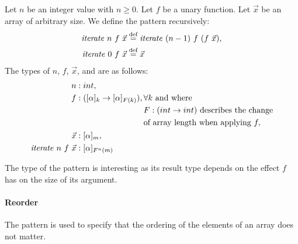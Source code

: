 \begin{definition}
  \label{definition:pattern:iterate}
  Let $n$ be an integer value with $n \geq 0$.
  Let $f$ be a unary function.
  Let $\vec{x}$ be an array of arbitrary size.
  We define the \iterateN pattern recursively:
  \begin{align*}
    \iterateN\ n\ f\ \vec{x} &\eqdef \iterateN\ (n-1)\ f\ (f\ \vec{x}),\\
    \iterateN\ 0\ f\ \vec{x} &\eqdef \vec{x}
  \end{align*}
  The types of $n$, $f$, $\vec{x}$, and \iterateN are as follows:
  \begin{align*}
    n &: int,\\
    f &: ([\alpha]_k \rightarrow [\alpha]_{F(k)}), 
      \begin{aligned}[t]
        & \forall k \text{ and where } \\
        &F : (int\rightarrow int) \text{ describes the change}\\
        &\text{of array length when applying } f,
      \end{aligned}\\
    \vec{x} &: [\alpha]_m,\\
    \text{\textit{iterate}}\ n\ f\ \vec{x} &: [\alpha]_{F^n(m)}
  \end{align*}
\end{definition}


\noindent
{}
The type of the \iterateN pattern is interesting as its result type depends on the effect $f$ has on the size of its argument.


\paragraph{Reorder}
The \reorder pattern is used to specify that the ordering of the elements of an array does not matter.


